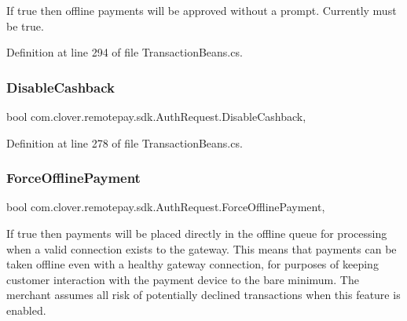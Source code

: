 If true then offline payments will be approved without a prompt. Currently must be true. 



Definition at line 294 of file Transaction\+Beans.\+cs.

\mbox{\label{classcom_1_1clover_1_1remotepay_1_1sdk_1_1_auth_request_acd92e15928d39787729933da4400ee6b}} 
\subsubsection{\texorpdfstring{Disable\+Cashback}{DisableCashback}}
{\footnotesize\ttfamily bool com.\+clover.\+remotepay.\+sdk.\+Auth\+Request.\+Disable\+Cashback\hspace{0.3cm}{\ttfamily [get]}, {\ttfamily [set]}}



Definition at line 278 of file Transaction\+Beans.\+cs.

\mbox{\label{classcom_1_1clover_1_1remotepay_1_1sdk_1_1_auth_request_ae60bb0644551b7c845472bfcef226de4}} 
\subsubsection{\texorpdfstring{Force\+Offline\+Payment}{ForceOfflinePayment}}
{\footnotesize\ttfamily bool com.\+clover.\+remotepay.\+sdk.\+Auth\+Request.\+Force\+Offline\+Payment\hspace{0.3cm}{\ttfamily [get]}, {\ttfamily [set]}}



If true then payments will be placed directly in the offline queue for processing when a valid connection exists to the gateway. This means that payments can be taken offline even with a healthy gateway connection, for purposes of keeping customer interaction with the payment device to the bare minimum. The merchant assumes all risk of potentially declined transactions when this feature is enabled. 



